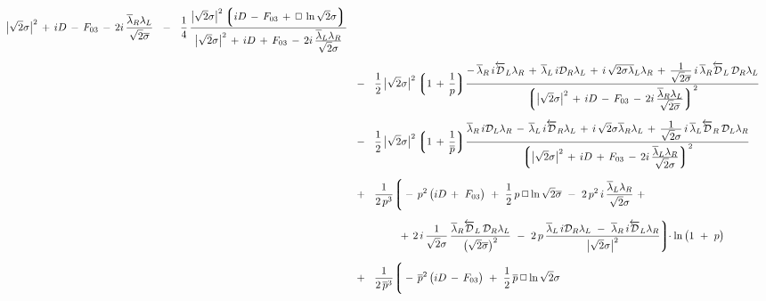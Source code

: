 \documentclass[epsfig,12pt]{article}
\newcommand{\ov}{\overline}
\newcommand{\md}{\mathcal{D}}
\newcommand{\lgr}{\left\lgroup}
\newcommand{\rgr}{\right\rgroup}
\begin{document}
\begin{align}
{			}
			{
				\big|\sqrt{2}\sigma\big|^2 \,+\, iD \,-\, F_{03} 
				\,-\, 2i\,\frac{\displaystyle \ov\lambda{}_R\lambda_L}{\displaystyle \sqrt{2}\ov\sigma}
			}
		~~-~~  \frac{1}{4}\,
			\frac{
				\big|\sqrt{2}\sigma\big|^2
				\lgr iD \,-\, F_{03} \,+\, \Box\, \ln \sqrt{2}\sigma \rgr
			}
			{
				\big|\sqrt{2}\sigma\big|^2 \,+\, iD \,+\, F_{03} 
				\,-\, 2i\,\frac{\displaystyle \ov\lambda{}_L\lambda_R}{\displaystyle \sqrt{2}\sigma}
			}
	\\[2mm]
%
\notag
	&
		~~-~~  \frac{1}{2}\, \big|\sqrt{2}\sigma\big|^2
			\lgr 1 \,+\, \frac{1}{p} \rgr \!
			\frac{ 
				-\, \ov\lambda{}_R\, i\overleftarrow{\md}_L \lambda_R  \,+\, \ov{\lambda}{}_L\, i\md_R \lambda_L \,+\,
				i\,\sqrt{2}\ov{\sigma \lambda}{}_L \lambda_R
				\,+\, \frac{\displaystyle 1}{\displaystyle \sqrt{2}\ov\sigma}\,
					i\, \ov\lambda{}_R \overleftarrow{\md}_L\, \md_R\lambda_L
			}
			{
			\lgr  
				\big|\sqrt{2}\sigma\big|^2 \,+\, iD \,-\, F_{03} 
				\,-\, 2i\,\frac{\displaystyle \ov\lambda{}_R\lambda_L}{\displaystyle \sqrt{2}\ov\sigma}  
			\rgr^2
			}
	\\[2mm]
%
\notag
	&
		~~-~~  \frac{1}{2}\, \big|\sqrt{2}\sigma\big|^2
			\lgr 1 \,+\, \frac{1}{\ov p} \rgr\!
			\frac{
				\ov\lambda{}_R\, i\md_L\lambda_R \,-\, \ov\lambda{}_L\, i\overleftarrow{\md}_R \lambda_L \,+\,
				i\,\sqrt{2}\sigma \ov\lambda{}_R \lambda_L
				\,+\, \frac{\displaystyle 1}{\displaystyle \sqrt{2}\sigma}\,
					i\, \ov\lambda{}_L \overleftarrow{\md}_R\, \md_L\lambda_R
			}
			{
			\lgr
				\big|\sqrt{2}\sigma\big|^2 \,+\, iD \,+\, F_{03} 
				\,-\, 2i\,\frac{\displaystyle \ov\lambda{}_L\lambda_R}{\displaystyle \sqrt{2}\sigma}
			\rgr^2
			}
	\\[2mm]
%
	&
		~~+~~  \frac{1}{2\, p^3}
			\Bigg\lgroup
				-\, p^2\, \big( iD \,+\ F_{03} \big)
				~+~  \frac{1}{2}\, p\, \Box \ln \sqrt{2}\ov\sigma
				~-~  2\, p^2\, i\, \frac{\ov\lambda{}_L \lambda_R}{\sqrt{2}\sigma}  ~+~
	\\[2mm]
%
\notag
	&
		\phantom{~~+~~  \frac{1}{2\, p^3} \Bigg\lgroup}
				+\, 2\, i\, \frac{1}{\sqrt{2}\sigma}\, 
					\frac{\ov\lambda{}_R \overleftarrow{\md}_L\, \md_R\lambda_L}{\big(\sqrt{2}\ov\sigma\big)^2}
				~-~  2\, p\, 
					\frac{\ov\lambda{}_L\, i\md_R \lambda_L ~-~ \ov\lambda{}_R\, i\overleftarrow{\md}_L \lambda_R}{\big|\sqrt{2}\sigma\big|^2}
			\Bigg\rgroup\!\!
		\cdot \ln \big( 1 ~+~ p \big)
	\\[2mm]
%
\notag
	&
		~~+~~  \frac{1}{2\, \ov p{}^3}
			\Bigg\lgroup
				-\, \ov p{}^2\, \big( iD \,-\, F_{03} \big)
				~+~  \frac{1}{2}\, \ov p\, \Box \ln \sqrt{2}\sigma

\end{align}
\end{document}
